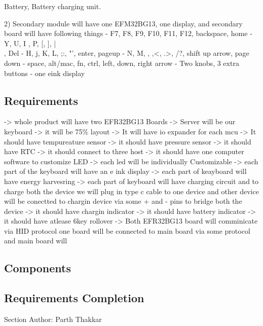 \documentclass[a4paper,11pt]{article}%
\begin{document}
Battery, Battery charging unit.

2) Secondary module will have one EFM32BG13, one display, and secondary board will have following things
- F7, F8, F9, F10, F11, F12, backspace, home
- Y, U, I , P, {[, ]}, |\\, Del
- H, j, K, L, ;:, "', enter, pageup
- N, M, , ,<, .>, /?, shift up arrow, page down
- space, alt/mac, fn, ctrl, left, down, right arrow
- Two knobs, 3 extra buttons
- one eink display

\subsection{Requirements}

-> whole product will have two EFR32BG13 Boards
-> Server will be our keyboard
-> it will be 75\% layout
-> It will have io expander for each mcu
-> It should have tempureature sensor 
-> it should have pressure sensor
-> it should have RTC
-> it should connect to three host
-> it should have one computer software to customize LED
-> each led will be individually Customizable
-> each part of the keyboard will have an e ink display
-> each part of keayboard will have energy harvesring 
-> each part of keyboard will have charging circuit and to charge both the device we will plug in type c cable to one device and other device will be conectted to chargin device via some + and - pins to bridge both the device 
-> it should have chargin indicator
-> it should have battery indicator 
-> it should have atlease 6key rollover 
-> Both EFR32BG13 board will comminicate via HID protocol one board will be connected to main board via some protocol and main board will 
\subsection{Components}

\subsection{Requirements Completion}
Section Author: Parth Thakkar\\\\
\end{document}
